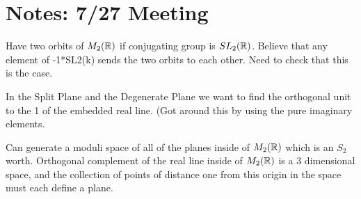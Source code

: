 \documentclass{article}
\newcommand{\cmark}{\color{red} \ding{51}}%
\newcommand{\done}{\rlap{$\square$}{\raisebox{2pt}{\large\hspace{1pt}\cmark}}%
\hspace{-2.5pt}}
\begin{document}
\section{Notes: 7/27 Meeting}
\begin{todolist}
    \item Have two orbits of $M_2(\protect\mathbb{R})$ if conjugating group is $SL_2(\protect\mathbb{R})$. Believe that any element of -1*SL2(k) sends the two orbits to each other. Need to check that this is the case.
    \item[\done] In the Split Plane and the Degenerate Plane we want to find the orthogonal unit to the 1 of the embedded real line. (Got around this by using the pure imaginary elements.
    \item[\done] Can generate a moduli space of all of the planes inside of $M_2(\protect\mathbb{R})$ which is an $S_2$ worth. Orthogonal complement of the real line inside of $M_2(\protect\mathbb{R})$ is a 3 dimensional space, and the collection of points of distance one from this origin in the space must each define a plane.
\end{todolist}
\end{document}
